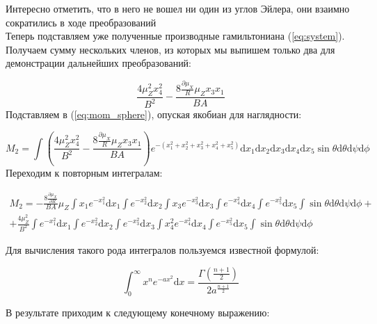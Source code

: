 Интересно отметить, что в него не вошел ни один из углов Эйлера, они взаимно сократились в ходе преобразований\\
Теперь подставляем уже полученные производные гамильтониана (\ref{eq:system}). Получаем сумму нескольких членов, из которых мы выпишем только два для демонстрации дальнейших преобразований:

\[
\frac{4\mu_Z^2 x^2_4}{B^2}-\frac{8\frac{\partial \mu_X}{R}\mu_Z x_3x_1}{BA}
\]
Подставляем в (\ref{eq:mom_sphere}), опуская якобиан для наглядности:

\begin{equation*}
M_2 =   {\int \left( \frac{4\mu_Z^2 x^2_4}{B^2}-\frac{8\frac{\partial \mu_X}{R}\mu_Z x_3x_1}{BA} \right) e^{-(x_1^2+x_2^2+x_3^2+x_4^2+x_5^2)} \mathrm{d}x_1 \mathrm{d}x_2 \mathrm{d}x_3 \mathrm{d}x_4 \mathrm{d}x_5  \sin\theta \mathrm{d}\theta \mathrm{d}\psi \mathrm{d}\phi}
\end{equation*}
Переходим к повторным интегралам:

\begin{equation*}
\begin{aligned}
M_2 = - \frac{8\frac{\partial \mu_X}{\partial R}}{BA}\mu_Z \int x_1e^{-x_1^2}  \mathrm{d}x_1 \int e^{-x_2^2}  \mathrm{d}x_2 \int x_3e^{-x_3^2}  \mathrm{d}x_3 \int e^{-x_4^2}  \mathrm{d}x_4  \int e^{-x_5^2}  \mathrm{d}x_5 \int \sin\theta \mathrm{d}\theta \mathrm{d}\psi \mathrm{d}\phi + \\
+ \frac{4\mu_Z^2}{B^2}\int e^{-x_1^2}  \mathrm{d}x_1 \int e^{-x_2^2}  \mathrm{d}x_2 \int e^{-x_3^2}  \mathrm{d}x_3 \int x_4^2 e^{-x_4^2}  \mathrm{d}x_4  \int e^{-x_5^2}  \mathrm{d}x_5 \int \sin\theta \mathrm{d}\theta \mathrm{d}\psi \mathrm{d}\phi
 \end{aligned}
\end{equation*}

Для вычисления такого рода интегралов пользуемся известной формулой:

\[
\int^{\infty}_0 x^n e^{-ax^2} \mathrm{d}x = \frac{\Gamma\left( \frac{n+1}{2}\right)}{2a^{\frac{n+1}{2}}}
\]


В результате приходим к следующему конечному выражению:

